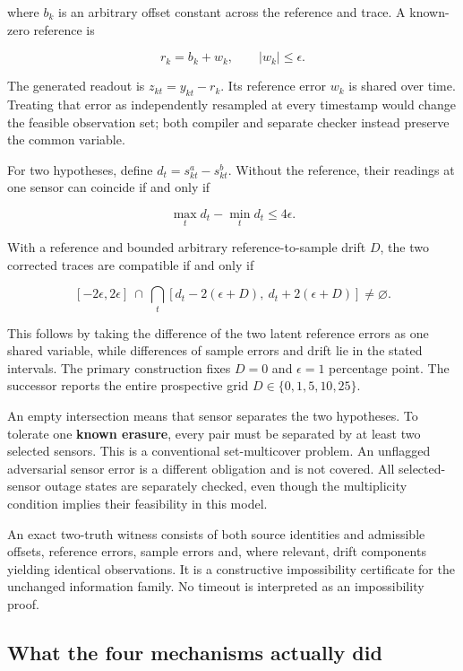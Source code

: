 \documentclass[
  11pt,
]{article}
\begin{document}
where \(b_k\) is an arbitrary offset constant across the reference and
trace. A known-zero reference is

\[r_k=b_k+w_k,\qquad |w_k|\leq\epsilon.\]

The generated readout is \(z_{kt}=y_{kt}-r_k\). Its reference error
\(w_k\) is shared over time. Treating that error as independently
resampled at every timestamp would change the feasible observation set;
both compiler and separate checker instead preserve the common variable.

For two hypotheses, define \(d_t=s^a_{kt}-s^b_{kt}\). Without the
reference, their readings at one sensor can coincide if and only if

\[\max_t d_t-\min_t d_t\leq4\epsilon.\]

With a reference and bounded arbitrary reference-to-sample drift \(D\),
the two corrected traces are compatible if and only if

\[[-2\epsilon,2\epsilon]\ \cap\ \bigcap_t[d_t-2(\epsilon+D),\ d_t+2(\epsilon+D)]\neq\varnothing.\]

This follows by taking the difference of the two latent reference errors
as one shared variable, while differences of sample errors and drift lie
in the stated intervals. The primary construction fixes \(D=0\) and
\(\epsilon=1\) percentage point. The successor reports the entire
prospective grid \(D\in\{0,1,5,10,25\}\).

An empty intersection means that sensor separates the two hypotheses. To
tolerate one \textbf{known erasure}, every pair must be separated by at
least two selected sensors. This is a conventional set-multicover
problem. An unflagged adversarial sensor error is a different obligation
and is not covered. All selected-sensor outage states are separately
checked, even though the multiplicity condition implies their
feasibility in this model.

An exact two-truth witness consists of both source identities and
admissible offsets, reference errors, sample errors and, where relevant,
drift components yielding identical observations. It is a constructive
impossibility certificate for the unchanged information family. No
timeout is interpreted as an impossibility proof.

\hypertarget{what-the-four-mechanisms-actually-did}{%
\subsection{What the four mechanisms actually
did}\label{what-the-four-mechanisms-actually-did}}
\end{document}
